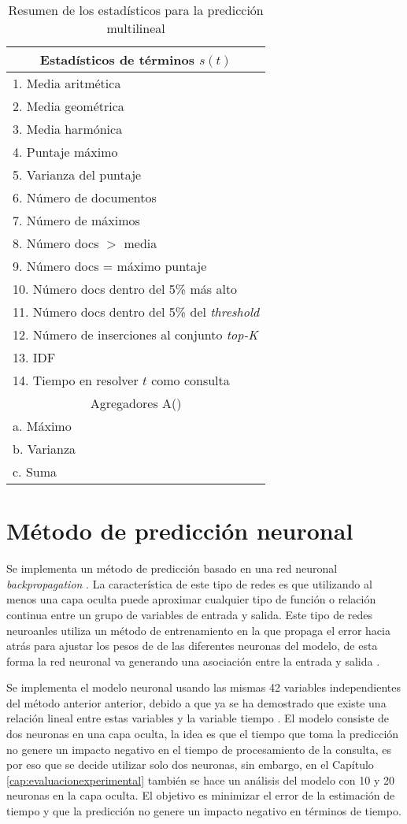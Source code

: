 \begin{table}[!ht]
\centering
\caption{Resumen de los estadísticos para la predicción multilineal}
\begin{tabular}{|l|}
\hline
\multicolumn{1}{|c|}{Estadísticos de términos $s(t)$} \\ \hline
1. Media aritmética \\ 
2. Media geométrica \\ 
3. Media harmónica \\ 
4. Puntaje máximo \\ 
5. Varianza del puntaje \\ 
6. Número de documentos \\ 
7. Número de máximos \\ 
8. Número docs $>$ media \\ 
9. Número docs = máximo puntaje \\ 
10. Número docs dentro del 5\% más alto \\
11. Número docs dentro del 5\% del \textit{threshold} \\ 
12. Número de inserciones al conjunto \textit{top-K} \\ 
13. IDF \\ 
14. Tiempo en resolver $t$ como consulta \\ \hline
\multicolumn{1}{|c|}{Agregadores A()} \\ \hline
a. Máximo \\ 
b. Varianza  \\ 
c. Suma \\ \hline
\end{tabular}
\label{tabla:estadisticosGlasgow}
\end{table}

\section{Método de predicción neuronal}
\label{scheduling:neuronal}
Se implementa un método de predicción basado en una red neuronal \textit{backpropagation} \citep{Rumelhart:1988}. La característica de este tipo de redes es que utilizando al menos una capa oculta puede aproximar cualquier tipo de función o relación continua entre un grupo de variables de entrada y salida. Este tipo de redes neuroanles utiliza un método de entrenamiento en la que propaga el error hacia atrás para ajustar los pesos de de las diferentes neuronas del modelo, de esta forma la red neuronal va generando una asociación entre la entrada y salida \citep{Fausett:1994}.

Se implementa el modelo neuronal usando las mismas 42 variables independientes del método anterior anterior, debido a que ya se ha demostrado que existe una relación lineal entre estas variables y la variable tiempo \citep{Macdonald:2012, Hauff:2010, He:2004}. El modelo consiste de dos neuronas en una capa oculta, la idea es que el tiempo que toma la predicción no genere un impacto negativo en el tiempo de procesamiento de la consulta, es por eso que se decide utilizar solo dos neuronas, sin embargo, en el Capítulo \ref{cap:evaluacionexperimental} también se hace un análisis del modelo con 10 y 20 neuronas en la capa oculta. El objetivo es minimizar el error de la estimación de tiempo y que la predicción no genere un impacto negativo en términos de tiempo.